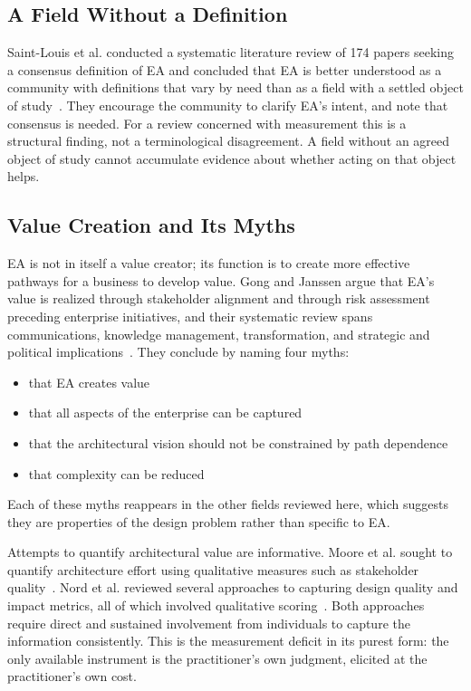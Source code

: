 \documentclass{csimq}
\begin{document}
\subsection{A Field Without a Definition}

Saint-Louis et al. conducted a systematic literature review of 174 papers
seeking a consensus definition of EA and concluded that EA is better understood
as a community with definitions that vary by need than as a field with a settled
object of study~\cite{saintlouis2017}. They encourage the community to clarify
EA's intent, and note that consensus is needed. For a review concerned with
measurement this is a structural finding, not a terminological disagreement. A field
without an agreed object of study cannot accumulate evidence about whether
acting on that object helps.

\subsection{Value Creation and Its Myths}

EA is not in itself a value creator; its function is to create more effective
pathways for a business to develop value. Gong and Janssen argue that EA's value
is realized through stakeholder alignment and through risk assessment preceding
enterprise initiatives, and their systematic review spans communications,
knowledge management, transformation, and strategic and political
implications~\cite{gong2019}. They conclude by naming four myths:

\begin{itemize}
\item that EA creates value
\item that all aspects of the enterprise can be captured
\item that the architectural vision should not be constrained by path
dependence
\item that complexity can be reduced
\end{itemize}

Each of these myths reappears in the other fields reviewed here, which
suggests they are properties of the design problem rather than specific to EA.

Attempts to quantify architectural value are informative. Moore et al.
sought to quantify architecture effort using qualitative measures such as
stakeholder quality~\cite{moore2003}. Nord et al. reviewed several approaches
to capturing design quality and impact metrics, all of which involved
qualitative scoring~\cite{nord2014}. Both approaches require direct and
sustained involvement from individuals to capture the information consistently.
This is the measurement deficit in its purest form: the only available instrument
is the practitioner's own judgment, elicited at the practitioner's own cost.
\end{document}
